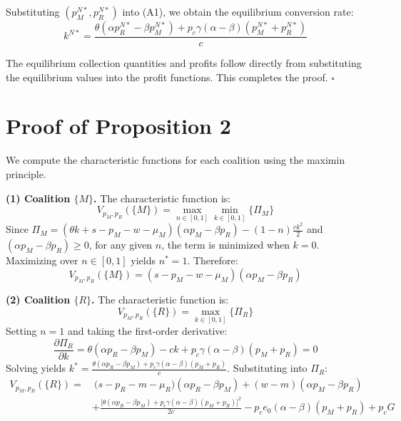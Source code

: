 \documentclass[authoryear,preprint,review,times,10pt]{elsarticle}
\begin{document}
Substituting $(p_M^{N*}, p_R^{N*})$ into (A1), we obtain the equilibrium conversion rate:
\begin{equation}
k^{N*} = \frac{\theta(\alpha p_R^{N*} - \beta p_M^{N*}) + p_c \gamma (\alpha - \beta)(p_M^{N*} + p_R^{N*})}{c}
\end{equation}

The equilibrium collection quantities and profits follow directly from substituting the equilibrium values into the profit functions. This completes the proof. \hfill $\square$

\section{Proof of Proposition 2}

We compute the characteristic functions for each coalition using the maximin principle.

\textbf{(1) Coalition $\{M\}$.} The characteristic function is:
\begin{equation}
V_{p_M,p_R}(\{M\}) = \max_{n \in [0,1]} \min_{k \in [0,1]} \{\Pi_M\}
\end{equation}
Since $\Pi_M = (\theta k + s - p_M - w - \mu_M)(\alpha p_M - \beta p_R) - (1 - n)\frac{ck^2}{2}$ and $(\alpha p_M - \beta p_R) \geq 0$, for any given $n$, the term is minimized when $k = 0$. Maximizing over $n \in [0,1]$ yields $n^* = 1$. Therefore:
\begin{equation}
V_{p_M,p_R}(\{M\}) = (s - p_M - w - \mu_M)(\alpha p_M - \beta p_R)
\tag{B1}
\end{equation}

\textbf{(2) Coalition $\{R\}$.} The characteristic function is:
\begin{equation}
V_{p_M,p_R}(\{R\}) = \max_{k \in [0,1]} \{\Pi_R\}
\end{equation}
Setting $n = 1$ and taking the first-order derivative:
\begin{equation}
\frac{\partial \Pi_R}{\partial k} = \theta(\alpha p_R - \beta p_M) - ck + p_c \gamma (\alpha - \beta)(p_M + p_R) = 0
\end{equation}
Solving yields $k^* = \frac{\theta(\alpha p_R - \beta p_M) + p_c \gamma (\alpha - \beta)(p_M + p_R)}{c}$. Substituting into $\Pi_R$:
\begin{equation}
\begin{aligned}
V_{p_M,p_R}(\{R\}) =&\ \big(s - p_R - m - \mu_R\big)(\alpha p_R - \beta p_M) + (w - m)(\alpha p_M - \beta p_R) \\
&+ \frac{\big[\theta(\alpha p_R - \beta p_M) + p_c \gamma (\alpha - \beta)(p_M + p_R)\big]^2}{2c} - p_c e_0 (\alpha - \beta)(p_M + p_R) + p_c G
\end{aligned}
\tag{B2}
\end{equation}
\end{document}
